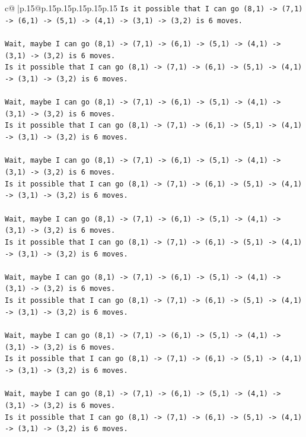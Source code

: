 \documentclass{article}
\begin{document}
{\begin{supertabular}{c@{$\;$}|p{.15\linewidth}@{}p{.15\linewidth}p{.15\linewidth}p{.15\linewidth}p{.15\linewidth}p{.15\linewidth}}
{{{\texttt{Is it possible that I can go (8,1) {-}> (7,1) {-}> (6,1) {-}> (5,1) {-}> (4,1) {-}> (3,1) {-}> (3,2) is 6 moves.} \\
\\ 
\texttt{Wait, maybe I can go (8,1) {-}> (7,1) {-}> (6,1) {-}> (5,1) {-}> (4,1) {-}> (3,1) {-}> (3,2) is 6 moves.} \\
\texttt{Is it possible that I can go (8,1) {-}> (7,1) {-}> (6,1) {-}> (5,1) {-}> (4,1) {-}> (3,1) {-}> (3,2) is 6 moves.} \\
\\ 
\texttt{Wait, maybe I can go (8,1) {-}> (7,1) {-}> (6,1) {-}> (5,1) {-}> (4,1) {-}> (3,1) {-}> (3,2) is 6 moves.} \\
\texttt{Is it possible that I can go (8,1) {-}> (7,1) {-}> (6,1) {-}> (5,1) {-}> (4,1) {-}> (3,1) {-}> (3,2) is 6 moves.} \\
\\ 
\texttt{Wait, maybe I can go (8,1) {-}> (7,1) {-}> (6,1) {-}> (5,1) {-}> (4,1) {-}> (3,1) {-}> (3,2) is 6 moves.} \\
\texttt{Is it possible that I can go (8,1) {-}> (7,1) {-}> (6,1) {-}> (5,1) {-}> (4,1) {-}> (3,1) {-}> (3,2) is 6 moves.} \\
\\ 
\texttt{Wait, maybe I can go (8,1) {-}> (7,1) {-}> (6,1) {-}> (5,1) {-}> (4,1) {-}> (3,1) {-}> (3,2) is 6 moves.} \\
\texttt{Is it possible that I can go (8,1) {-}> (7,1) {-}> (6,1) {-}> (5,1) {-}> (4,1) {-}> (3,1) {-}> (3,2) is 6 moves.} \\
\\ 
\texttt{Wait, maybe I can go (8,1) {-}> (7,1) {-}> (6,1) {-}> (5,1) {-}> (4,1) {-}> (3,1) {-}> (3,2) is 6 moves.} \\
\texttt{Is it possible that I can go (8,1) {-}> (7,1) {-}> (6,1) {-}> (5,1) {-}> (4,1) {-}> (3,1) {-}> (3,2) is 6 moves.} \\
\\ 
\texttt{Wait, maybe I can go (8,1) {-}> (7,1) {-}> (6,1) {-}> (5,1) {-}> (4,1) {-}> (3,1) {-}> (3,2) is 6 moves.} \\
\texttt{Is it possible that I can go (8,1) {-}> (7,1) {-}> (6,1) {-}> (5,1) {-}> (4,1) {-}> (3,1) {-}> (3,2) is 6 moves.} \\
\\ 
\texttt{Wait, maybe I can go (8,1) {-}> (7,1) {-}> (6,1) {-}> (5,1) {-}> (4,1) {-}> (3,1) {-}> (3,2) is 6 moves.} \\
\texttt{Is it possible that I can go (8,1) {-}> (7,1) {-}> (6,1) {-}> (5,1) {-}> (4,1) {-}> (3,1) {-}> (3,2) is 6 moves.} \\
}}}
\end{supertabular}}
\end{document}
